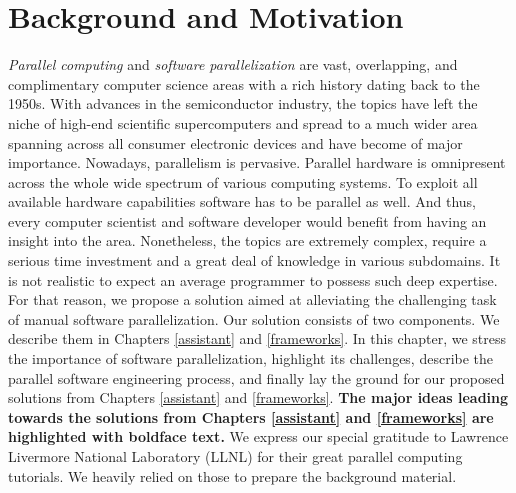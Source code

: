 \chapter{Background and Motivation}
\label{background}
\label{background}
\quad \textit{Parallel computing} and \textit{software parallelization} are vast, overlapping, and complimentary computer science areas with a rich history dating back to the 1950s. With advances in the semiconductor industry, the topics have left the niche of high-end scientific supercomputers and spread to a much wider area spanning across all consumer electronic devices and have become of major importance.\newline\null
\quad Nowadays, parallelism is pervasive. Parallel hardware is omnipresent across the whole wide spectrum of various computing systems. To exploit all available hardware capabilities software has to be parallel as well. And thus, every computer scientist and software developer would benefit from having an insight into the area. Nonetheless, the topics are extremely complex, require a serious time investment and a great deal of knowledge in various subdomains. It is not realistic to expect an average programmer to possess such deep expertise. For that reason, we propose a solution aimed at alleviating the challenging task of manual software parallelization. Our solution consists of two components. We describe them in Chapters \ref{assistant} and \ref{frameworks}.\newline\null
\quad In this chapter, we stress the importance of software parallelization, highlight its challenges, describe the parallel software engineering process, and finally lay the ground for our proposed solutions from Chapters \ref{assistant} and \ref{frameworks}. \textbf{The major ideas leading towards the solutions from Chapters \ref{assistant} and \ref{frameworks} are highlighted with boldface text.} We express our special gratitude to Lawrence Livermore National Laboratory (LLNL) \cite{llnl_computing} for their great parallel computing tutorials. We heavily relied on those to prepare the background material.\newline\null
%
